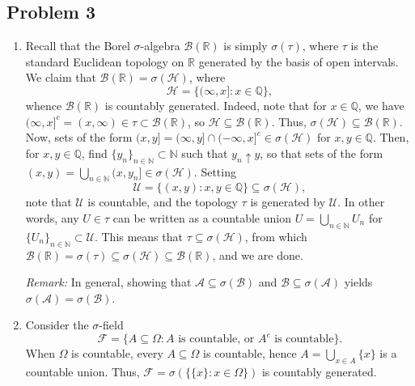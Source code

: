 \documentclass[11pt]{article}
\newcommand{\N}{\mathbb{N}}
\newcommand{\Q}{\mathbb{Q}}
\newcommand{\R}{\mathbb{R}}
\begin{document}
    \subsection*{Problem 3}

    \begin{enumerate}
        \item Recall that the Borel $\sigma$-algebra $\mathcal{B}(\R)$ is
        simply $\sigma(\tau)$, where $\tau$ is the standard Euclidean topology
        on $\R$ generated by the basis of open intervals.
        We claim that $\mathcal{B}(\R) = \sigma(\mathcal{H})$, where \[
            \mathcal{H} = \{(\infty, x]\colon x \in \Q\},
        \] whence $\mathcal{B}(\R)$ is countably generated.
        Indeed, note that for $x \in \Q$, we have $(\infty, x]^c = (x, \infty)
        \in \tau \subset \mathcal{B}(\R)$, so $\mathcal{H} \subseteq
        \mathcal{B}(\R)$.
        Thus, $\sigma(\mathcal{H}) \subseteq \mathcal{B}(\R)$.
        Now, sets of the form $(x, y] = (\infty, y] \cap (-\infty, x]^c \in
        \sigma(\mathcal{H})$ for $x, y \in \Q$.
        Then, for $x, y \in \Q$, find $\{y_n\}_{n \in \N} \subset \N$ such
        that $y_n \uparrow y$, so that sets of the form $(x, y) = \bigcup_{n
        \in \N} (x, y_n] \in \sigma(\mathcal{H})$.
        Setting \[
            \mathcal{U} = \{(x, y)\colon x, y \in \Q\} \subseteq \sigma(\mathcal{H}),
        \] note that $\mathcal{U}$ is countable, and the topology $\tau$ is
        generated by $\mathcal{U}$.
        In other words, any $U \in \tau$ can be written as a countable union
        $U = \bigcup_{n \in \N} U_n$ for $\{U_n\}_{n \in \N} \subset
        \mathcal{U}$.
        This means that $\tau \subseteq \sigma(\mathcal{H})$, from which
        $\mathcal{B}(\R) = \sigma(\tau) \subseteq \sigma(\mathcal{H})
        \subseteq \mathcal{B}(\R)$, and we are done.

        \emph{Remark:} In general, showing that $\mathcal{A} \subseteq
        \sigma(\mathcal{B})$ and $\mathcal{B} \subseteq \sigma(\mathcal{A})$
        yields $\sigma(\mathcal{A}) = \sigma(\mathcal{B})$.



        \item Consider the $\sigma$-field \[
            \mathcal{F} = \{A \subseteq \Omega\colon A\text{ is countable, or } A^c\text{ is countable}\}.
        \] When $\Omega$ is countable, every $A \subseteq \Omega$ is
        countable, hence $A = \bigcup_{x \in A}\{x\}$ is a countable union.
        Thus, $\mathcal{F} = \sigma(\{\{x\}\colon x \in \Omega\})$ is
        countably generated.


\end{enumerate}
\end{document}
